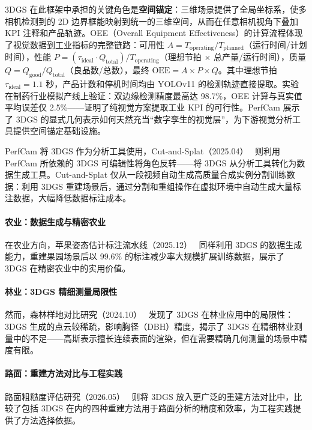 3DGS 在此框架中承担的关键角色是\textbf{空间锚定}：三维场景提供了全局坐标系，使多相机检测到的 2D 边界框能映射到统一的三维空间，从而在任意相机视角下叠加 KPI 注释和产品轨迹。OEE（Overall Equipment Effectiveness）的计算流程体现了视觉数据到工业指标的完整链路：可用性 $A = T_{\text{operating}} / T_{\text{planned}}$（运行时间/计划时间），性能 $P = (\tau_{\text{ideal}} \cdot Q_{\text{total}}) / T_{\text{operating}}$（理想节拍 $\times$ 总产量/运行时间），质量 $Q = Q_{\text{good}} / Q_{\text{total}}$（良品数/总数），最终 $\text{OEE} = A \times P \times Q$。其中理想节拍 $\tau_{\text{ideal}} = 1.1$ 秒，产品计数和停机时间均由 YOLOv11 的检测轨迹直接提取。实验在制药行业模拟产线上验证：双边缘检测精度最高达 98.7\%，OEE 计算与真实值平均误差仅 2.5\%——证明了纯视觉方案提取工业 KPI 的可行性。PerfCam 展示了 3DGS 的显式几何表示如何天然充当“数字孪生的视觉层”，为下游视觉分析工具提供空间锚定基础设施。

PerfCam 将 3DGS 作为分析工具使用，Cut-and-Splat（2025.04）~\cite{2504_08473} 则利用 PerfCam 所依赖的 3DGS 可编辑性将角色反转——将 3DGS 从分析工具转化为数据生成工具。Cut-and-Splat 仅从一段视频自动生成高质量合成实例分割训练数据：利用 3DGS 重建场景后，通过分割和重组操作在虚拟环境中自动生成大量标注数据，大幅降低数据标注成本。

\paragraph{农业：数据生成与精密农业}
在农业方向，苹果姿态估计标注流水线（2025.12）~\cite{2512_20148} 同样利用 3DGS 的数据生成能力，重建果园场景后以 99.6\% 的标注减少率大规模扩展训练数据，展示了 3DGS 在精密农业中的实用价值。

\paragraph{林业：3DGS 精细测量局限性}
然而，森林样地对比研究（2024.10）~\cite{2410_05772} 发现了 3DGS 在林业应用中的局限性：3DGS 生成的点云较稀疏，影响胸径（DBH）精度，揭示了 3DGS 在精细林业测量中的不足——高斯表示擅长连续表面的渲染，但在需要精确几何测量的场景中精度有限。

\paragraph{路面：重建方法对比与工程实践}
路面粗糙度评估研究（2026.05）~\cite{2605_29452} 则将 3DGS 放入更广泛的重建方法对比中，比较了包括 3DGS 在内的四种重建方法用于路面分析的精度和效率，为工程实践提供了方法选择依据。

